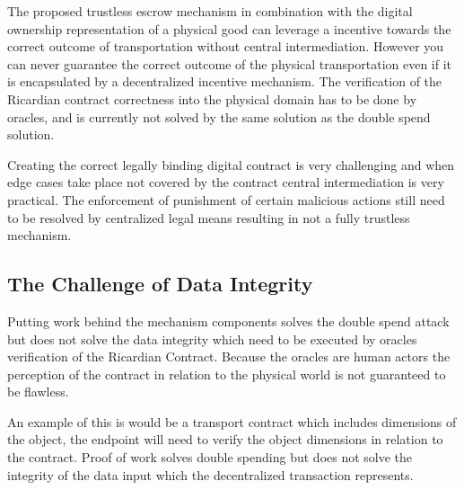 
The proposed trustless escrow mechanism in combination with the digital ownership representation of a physical good can leverage a incentive towards the correct outcome of transportation without central intermediation. However you can never guarantee the correct outcome of the physical transportation even if it is encapsulated by a decentralized incentive mechanism. The verification of the Ricardian contract correctness into the physical domain has to be done by oracles, and is currently not solved by the same solution as the double spend solution.\par
Creating the correct legally binding digital contract is very challenging and when edge cases take place not covered by the contract central intermediation is very practical. The enforcement of punishment of certain malicious actions still need to be resolved by centralized legal means resulting in not a fully trustless mechanism. \par

\subsection{The Challenge of Data Integrity}

Putting work behind the mechanism components solves the double spend attack but does not solve the data integrity which need to be executed by oracles verification of the Ricardian Contract. Because the oracles are human actors the perception of the contract in relation to the physical world is not guaranteed to be flawless. \par
An example of this is would be a transport contract which includes dimensions of the object, the endpoint will need to verify the object dimensions in relation to the contract. Proof of work solves double spending but does not solve the integrity of the data input which the decentralized transaction represents.

